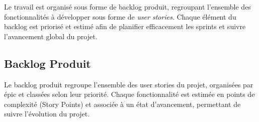 Le travail est organisé sous forme de backlog produit, regroupant l’ensemble des fonctionnalités à développer sous forme de \textit{user stories}. Chaque élément du backlog est priorisé et estimé afin de planifier efficacement les sprints et suivre l’avancement global du projet.\\


\subsection{Backlog Produit}

Le backlog produit regroupe l’ensemble des user stories du projet, organisées par épic et classées selon leur priorité. Chaque fonctionnalité est estimée en points de complexité (Story Points) et associée à un état d’avancement, permettant de suivre l’évolution du projet.\\






\renewcommand{\arraystretch}{1.4}

